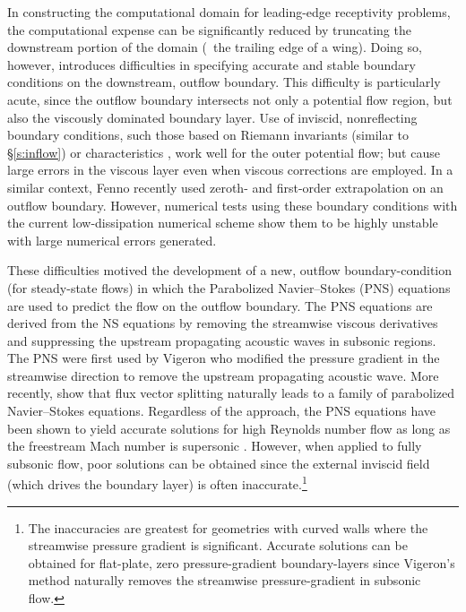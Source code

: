 In constructing the computational domain for leading-edge receptivity
problems, the computational expense can be significantly reduced by truncating
the downstream portion of the domain (\eg\ the trailing edge of a wing).
Doing so, however, introduces difficulties in specifying accurate and stable
boundary conditions on the downstream, outflow boundary.  This difficulty is
particularly acute, since the outflow boundary intersects not only a potential
flow region, but also the viscously dominated boundary layer.  Use of
inviscid, nonreflecting boundary conditions, such those based on Riemann
invariants (similar to \S\ref{s:inflow}) or characteristics
\cite{PoLe:92,Giles:90,Thompson:90}, work well for the outer potential flow;
but cause large errors in the viscous layer even when viscous corrections
\cite{PoLe:92} are employed.  In a similar context, Fenno \cite{Fenno:93}
recently used zeroth- and first-order extrapolation on an outflow boundary.
However, numerical tests using these boundary conditions with the current
low-dissipation numerical scheme show them to be highly unstable with large
numerical errors generated.

These difficulties motived the development of a new, outflow
boundary-condition (for steady-state flows) in which the Parabolized
Navier--Stokes (PNS) equations are used to predict the flow on the outflow
boundary.  The PNS equations are derived from the NS equations by removing the
streamwise viscous derivatives and suppressing the upstream propagating
acoustic waves in subsonic regions.  The PNS were first used by Vigeron \etal
\cite{ViRaTa:78} who modified the pressure gradient in the streamwise
direction to remove the upstream propagating acoustic wave.  More recently,
\cite{ChMe:89} show that flux vector splitting naturally leads to a family of
parabolized Navier--Stokes equations.  Regardless of the approach, the PNS
equations have been shown to yield accurate solutions for high Reynolds number
flow as long as the freestream Mach number is supersonic \cite{ViRaTa:78}.
However, when applied to fully subsonic flow, poor solutions can be obtained
since the external inviscid field (which drives the boundary layer) is often
inaccurate.\footnote{The inaccuracies are greatest for geometries with curved
walls where the streamwise pressure gradient is significant.  Accurate
solutions can be obtained for flat-plate, zero pressure-gradient
boundary-layers since Vigeron's method naturally removes the streamwise
pressure-gradient in subsonic flow.}

